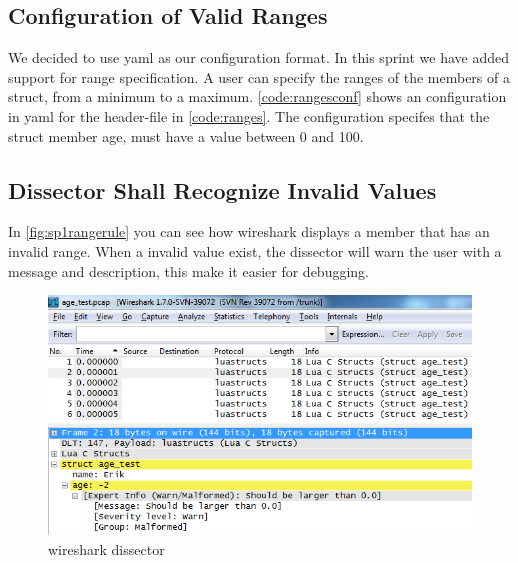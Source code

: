\subsection{Configuration of Valid Ranges}
We decided to use \gls{yaml} as our configuration format. In this sprint we have
added support for range specification. A user can specify the ranges of the
\glspl{member} of a \gls{struct}, from a minimum to a maximum. \autoref{code:rangesconf} 
shows an configuration in \gls{yaml} for the \gls{header}-file in \autoref{code:ranges}. 
The configuration specifes that the \gls{struct} \gls{member} age, must have a value 
between 0 and 100.  





\subsection{Dissector Shall Recognize Invalid Values}
In \autoref{fig:sp1rangerule} you can see how \Gls{wireshark} displays a \gls{member} that 
has an invalid range. When a invalid value exist, the \gls{dissector} will warn the 
user with a message and description, this make it easier for debugging.

\begin{figure}[htb]
	\center
	\includegraphics[width=\textwidth]{./sprints/img/wireshark_outofrange}
	\caption{\Gls{wireshark} \gls{dissector}\label{fig:sp1rangerule}}
\end{figure}

